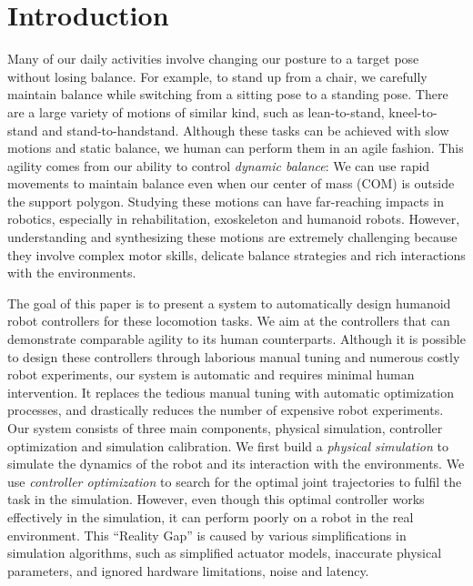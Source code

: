 \section{Introduction}


Many of our daily activities involve changing our posture to a target pose without losing balance. For example, to stand up from a chair, we carefully maintain balance while switching from a sitting pose to a standing pose. There are a large variety of motions of similar kind, such as lean-to-stand, kneel-to-stand and stand-to-handstand. Although these tasks can be achieved with slow motions and static balance, we human can perform them in an agile fashion. This agility comes from our ability to control \emph{dynamic balance}: We can use rapid movements to maintain balance even when our center of mass (COM) is outside the support polygon. Studying these motions can have far-reaching impacts in robotics, especially in rehabilitation, exoskeleton and humanoid robots. However, understanding and synthesizing these motions are extremely challenging because they involve complex motor skills, delicate balance strategies and rich interactions with the environments. 



The goal of this paper is to present a system to automatically design humanoid robot controllers for these locomotion tasks. We aim at the controllers that can demonstrate comparable agility to its human counterparts. Although it is possible to design these controllers through laborious manual tuning and numerous costly robot experiments, our system is automatic and requires minimal human intervention. It replaces the tedious manual tuning with automatic optimization processes, and drastically reduces the number of expensive robot experiments. Our system consists of three main components, physical simulation, controller optimization and simulation calibration. We first build a \emph{physical simulation} to simulate the dynamics of the robot and its interaction with the environments. We use \emph{controller optimization} to search for the optimal joint trajectories to fulfil the task in the simulation. However, even though this optimal controller works effectively in the simulation, it can perform poorly on a robot in the real environment. This ``Reality Gap'' \cite{Jakobi95} is caused by various simplifications in simulation algorithms, such as simplified actuator models, inaccurate physical parameters, and ignored hardware limitations, noise and latency. 


